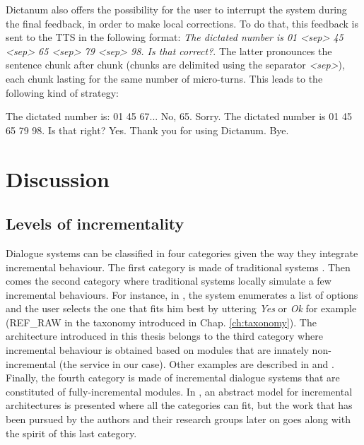         Dictanum also offers the possibility for the user to interrupt the system during the final feedback, in order to make local corrections. To do that, this feedback is sent to the TTS in the following format: \textit{The dictated number is 01 <sep> 45 <sep> 65 <sep> 79 <sep> 98. Is that correct?}. The latter pronounces the sentence chunk after chunk (chunks are delimited using the separator \textit{<sep>}), each chunk lasting for the same number of micro-turns. This leads to the following kind of strategy:
        
        \begin{dialogue}
             The dictated number is: 01 45 67...
             No, 65.
             Sorry. The dictated number is 01 45 65 79 98. Is that right?
             Yes.
             Thank you for using Dictanum. Bye.
        \end{dialogue}
    
\section{Discussion}

	\subsection{Levels of incrementality}
    
    	Dialogue systems can be classified in four categories given the way they integrate incremental behaviour. The first category is made of traditional systems \cite{CLASSiCd64}. Then comes the second category where traditional systems locally simulate a few incremental behaviours. For instance, in \cite{El-Asri2014a}, the system enumerates a list of options and the user selects the one that fits him best by uttering \textit{Yes} or \textit{Ok} for example (REF\_RAW in the taxonomy introduced in Chap. \ref{ch:taxonomy}). The architecture introduced in this thesis belongs to the third category where incremental behaviour is obtained based on modules that are innately non-incremental (the service in our case). Other examples are described in \cite{Selfridge2012a} and \cite{Hastie2013}. Finally, the fourth category is made of incremental dialogue systems that are constituted of fully-incremental modules. In \cite{Schlangen2011}, an abstract model for incremental architectures is presented where all the categories can fit, but the work that has been pursued by the authors and their research groups later on goes along with the spirit of this last category.
		
